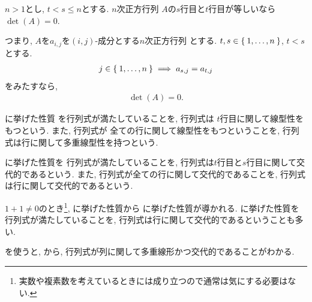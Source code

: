 \begin{theorem}
  \label{thm:det:alt:row:zero}
  $n>1$とし, $t<s\leq n$とする. 
  $n$次正方行列
  $A$の$s$行目と$t$行目が等しいなら$\det(A)=0$.

  つまり, 
  $A$を$a_{i,j}$を$(i,j)$-成分とする$n$次正方行列
  とする.
  $t, s\in\Set{1,\ldots,n}$, $t<s$とする. 
  \begin{align*}
    j\in\Set{1,\ldots,n}\implies a_{s,j}=a_{t,j}
  \end{align*}
  をみたすなら,
  \begin{align*}
    \det(A)=0.
  \end{align*}
\end{theorem}

\begin{remark}
  に挙げた性質
  を行列式が満たしていることを,
  行列式は
  $t$行目に関して線型性をもつという.
  また,
  行列式が
  全ての行に関して線型性をもつということを,
  行列式は行に関して多重線型性を持つという.

  に挙げた性質を
  行列式が満たしていることを,
  行列式は$t$行目と$s$行目に関して交代的であるという.
  また, 行列式が全ての行に関して交代的であることを,
  行列式は行に関して交代的であるという.

  $1+1\neq 0$のとき\footnote{実数や複素数を考えているときには成り立つので通常は気にする必要はない.},
  に挙げた性質から
  に挙げた性質が導かれる.
  に挙げた性質を
  行列式が満たしていることを,
  行列式は行に関して交代的であるということも多い.
\end{remark}

を使うと,
から,
行列式が列に関して多重線形かつ交代的であることがわかる.

